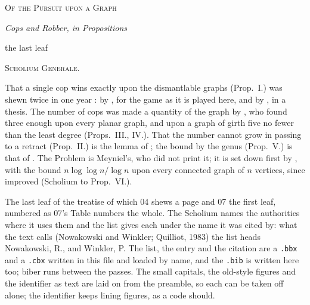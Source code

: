 \documentclass[11pt]{article}
\providecommand*{\textls}[2][]{#2}
\begin{document}
\begin{center}
  {\small\textls[130]{\textsc{Of the Pursuit upon a Graph}}}\par
  \vspace{0.3em}
  {\Large\itshape Cops and Robber, in Propositions}\par
  \vspace{0.3em}
  {\footnotesize the last leaf}
\end{center}

\vspace{0.6em}

\par{}%
\centerline{\small\textls[120]{\textsc{Scholium Generale.}}}%
\nobreak\vspace{.3em}\noindent
That a single cop wins exactly upon the dismantlable graphs (Prop.~I.) was
shewn twice in one year \parencite{nowakowski1983,quilliot1983}: by
\citeauthor{nowakowski1983}, for the game as it is played here, and by
\citeauthor{quilliot1983}, in a thesis. The number of cops was made a
quantity of the graph by \textcite{aigner1984}, who found three enough upon
every planar graph, and upon a graph of girth five no fewer than the least
degree (Props.~III., IV.). That the number cannot grow in passing to a
retract (Prop.~II.) is the lemma of \textcite{berarducci1993}; the bound
by the genus (Prop.~V.) is that of \textcite{schroder2001}. The Problem
is Meyniel's, who did not print it; it is set down first by
\textcite{frankl1987}, with the bound $n \log\log n / \log n$ upon every
connected graph of $n$ vertices, since improved (Scholium to Prop.~VI.).

\printbibliography

\vspace{1.2em}
\footnotesize\noindent
The last leaf of the treatise of which 04 shews a page and 07 the first
leaf, numbered as 07's Table numbers the whole. The Scholium names the
authorities where it uses them and the list gives each under the name it
was cited by: what the text calls (Nowakowski and Winkler; Quilliot, 1983)
the list heads Nowakowski, R., and Winkler, P. The list, the entry and the
citation are a \texttt{.bbx} and a \texttt{.cbx} written in this file and
loaded by name, and the \texttt{.bib} is written here too; biber runs
between the passes. The small capitals, the old-style figures and the
identifier as text are laid on from the preamble, so each can be taken off
alone; the identifier keeps lining figures, as a code should.

\medskip\noindent\itshape\atlasstamp
\end{document}
